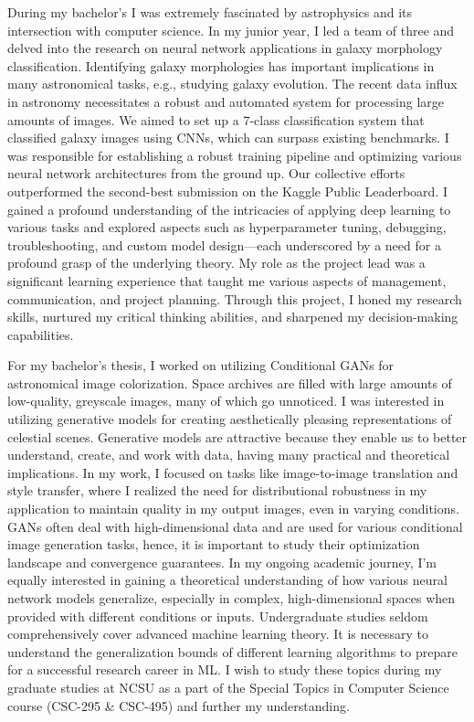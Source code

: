 \documentclass{article}
\begin{document}
  \vspace{5pt}
\hspace{0.25in}During my bachelor’s I was extremely fascinated by astrophysics and its
intersection with computer science. In my junior year, I led a team of three and
delved into the research on neural network applications in galaxy morphology
classification. Identifying galaxy morphologies has important implications in
many astronomical tasks, e.g., studying galaxy evolution. The recent data influx
in astronomy necessitates a robust and automated system for processing large
amounts of images. We aimed to set up a 7-class classification system that
classified galaxy images using CNNs, which can surpass existing benchmarks. I
was responsible for establishing a robust training pipeline and optimizing
various neural network architectures from the ground up. Our collective efforts
outperformed the second-best submission on the Kaggle Public Leaderboard. I
gained a profound understanding of the intricacies of applying deep learning to
various tasks and explored aspects such as hyperparameter tuning, debugging,
troubleshooting, and custom model design—each underscored by a need for a
profound grasp of the underlying theory. My role as the project lead was a
significant learning experience that taught me various aspects of management,
communication, and project planning. Through this project, I honed my research
skills, nurtured my critical thinking abilities, and sharpened my
decision-making capabilities. 

  \vspace{5pt}
\hspace{0.25in}For my bachelor’s thesis, I worked on utilizing Conditional GANs for
astronomical image colorization. Space archives are filled with large amounts of
low-quality, greyscale images, many of which go unnoticed. I was interested in
utilizing generative models for creating aesthetically pleasing representations
of celestial scenes. Generative models are attractive because they enable us to
better understand, create, and work with data, having many practical and
theoretical implications. In my work, I focused on tasks like image-to-image
translation and style transfer, where I realized the need for distributional
robustness in my application to maintain quality in my output images, even in
varying conditions. GANs often deal with high-dimensional data and are used for
various conditional image generation tasks, hence, it is important to study
their optimization landscape and convergence guarantees. In my ongoing academic
journey, I’m equally interested in gaining a theoretical understanding of how
various neural network models generalize, especially in complex,
high-dimensional spaces when provided with different conditions or inputs.
Undergraduate studies seldom comprehensively cover advanced machine learning
theory. It is necessary to understand the generalization bounds of different
learning algorithms to prepare for a successful research career in ML. I wish to
study these topics during my graduate studies at NCSU as a part of the Special
Topics in Computer Science course (CSC-295 \& CSC-495) and further my understanding.
\end{document}
